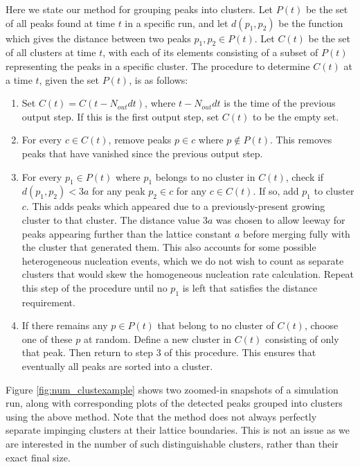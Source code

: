 Here we state our method for grouping peaks into clusters. Let $P(t)$ be the set of all peaks found at time $t$ in a specific run, and let $d(p_1,p_2)$ be the function which gives the distance between two peaks $p_1 , p_2 \in P(t)$. Let $C(t)$ be the set of all clusters at time $t$, with each of its elements consisting of a subset of $P(t)$ representing the peaks in a specific cluster. The procedure to determine $C(t)$ at a time $t$, given the set $P(t)$, is as follows: 
\begin{enumerate}
\item Set $C(t)=C(t-N_{out}dt)$, where $t-N_{out}dt$ is the time of the previous output step. If this is the first output step, set $C(t)$ to be the empty set.
\item For every $c \in C(t)$, remove peaks $p\in c$ where $p \notin P(t)$. This removes peaks that have vanished since the previous output step.
\item For every $p_1\in P(t)$ where $p_1$ belongs to no cluster in $C(t)$, check if $d(p_1,p_2)<3a$ for any peak $p_2\in c$ for any $c\in C(t)$. If so, add $p_1$ to cluster $c$. This adds peaks which appeared due to a previously-present growing cluster to that cluster. The distance value $3a$ was chosen to allow leeway for peaks appearing further than the lattice constant $a$ before merging fully with the cluster that generated them. This also accounts for some possible heterogeneous nucleation events, which we do not wish to count as separate clusters that would skew the homogeneous nucleation rate calculation. Repeat this step of the procedure until no $p_1$ is left that satisfies the distance requirement.
\item If there remains any $p\in P(t)$ that belong to no cluster of $C(t)$, choose one of these $p$ at random. Define a new cluster in $C(t)$ consisting of only that peak. Then return to step 3 of this procedure. This ensures that eventually all peaks are sorted into a cluster.
\end{enumerate}


Figure \ref{fig:num_clustexample} shows two zoomed-in snapshots of a simulation run, along with corresponding plots of the detected peaks grouped into clusters using the above method. Note that the method does not always perfectly separate impinging clusters at their lattice boundaries. This is not an issue as we are interested in the number of such distinguishable clusters, rather than their exact final size.

